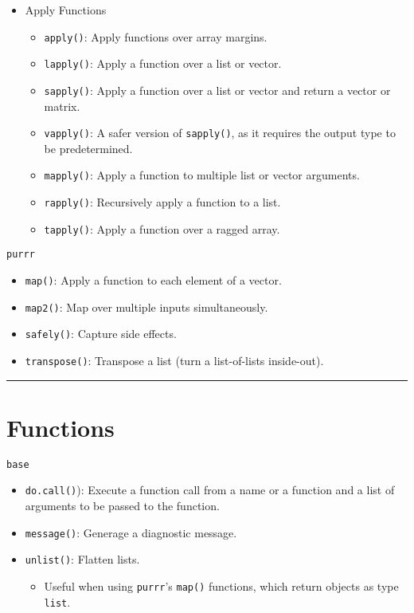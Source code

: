 \documentclass[]{book}
\providecommand{\tightlist}{%
  \setlength{\itemsep}{0pt}\setlength{\parskip}{0pt}}
\theoremstyle{definition}
\theoremstyle{definition}
\theoremstyle{definition}
\theoremstyle{remark}
\begin{document}
\begin{itemize}
\tightlist
\item
  Apply Functions

  \begin{itemize}
  \tightlist
  \item
    \texttt{apply()}: Apply functions over array margins.
  \item
    \texttt{lapply()}: Apply a function over a list or vector.
  \item
    \texttt{sapply()}: Apply a function over a list or vector and return
    a vector or matrix.
  \item
    \texttt{vapply()}: A safer version of \texttt{sapply()}, as it
    requires the output type to be predetermined.
  \item
    \texttt{mapply()}: Apply a function to multiple list or vector
    arguments.
  \item
    \texttt{rapply()}: Recursively apply a function to a list.
  \item
    \texttt{tapply()}: Apply a function over a ragged array.
  \end{itemize}
\end{itemize}

\texttt{purrr}

\begin{itemize}
\tightlist
\item
  \texttt{map()}: Apply a function to each element of a vector.
\item
  \texttt{map2()}: Map over multiple inputs simultaneously.
\item
  \texttt{safely()}: Capture side effects.
\item
  \texttt{transpose()}: Transpose a list (turn a list-of-lists
  inside-out).
\end{itemize}

\begin{center}\rule{0.5\linewidth}{\linethickness}\end{center}

\section{Functions}\label{functions}

\texttt{base}

\begin{itemize}
\tightlist
\item
  \texttt{do.call()}): Execute a function call from a name or a function
  and a list of arguments to be passed to the function.
\item
  \texttt{message()}: Generage a diagnostic message.
\item
  \texttt{unlist()}: Flatten lists.

  \begin{itemize}
  \tightlist
  \item
    Useful when using \texttt{purrr}'s \texttt{map()} functions, which
    return objects as type \texttt{list}.
  \end{itemize}
\end{itemize}
\end{document}
